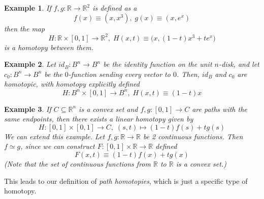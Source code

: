 \documentclass{article}
\newtheorem{example}{Example}[section]
\theoremstyle{remark}
\theoremstyle{definition}
\begin{document}
\begin{example}
If $f, g: \mathbb{R} \longrightarrow \mathbb{R}^2$ is defined as a
\[f(x) \equiv (x, x^3), \; g(x) \equiv (x, e^x)\]
then the map 
\[H: \mathbb{R} \times [0,1] \longrightarrow \mathbb{R}^2, \; H(x, t) \equiv \big( x, (1-t) x^3 + t e^x \big) \]
is a homotopy between them. 
\end{example}

\begin{example}
Let $id_B: B^n \longrightarrow B^n$ be the identity function on the unit $n$-disk, and let $c_0: B^n \longrightarrow B^n$ be the $0$-function sending every vector to $0$. Then, $id_B$ and $c_0$ are homotopic, with homotopy explicitly defined
\[H: B^n \times [0,1] \longrightarrow B^n, \; H(x, t) \equiv (1-t) x\]
\end{example}

\begin{example}
If $C \subseteq \mathbb{R}^n$ is a convex set and $f, g: [0,1] \longrightarrow C$ are paths with the same endpoints, then there exists a \textit{linear homotopy} given by 
\[H: [0,1] \times [0,1] \longrightarrow C, \; (s, t) \mapsto (1-t) f(s) + t g(s)\]
We can extend this example. Let $f, g: \mathbb{R} \longrightarrow \mathbb{R}$ be 2 continuous functions. Then $f \simeq g$, since we can construct $F: [0,1] \times \mathbb{R} \longrightarrow \mathbb{R}$ defined
\[F(x, t) \equiv (1-t) f(x) + t g(x)\]
(Note that the set of continuous functions from $\mathbb{R}$ to $\mathbb{R}$ is a convex set.)
\end{example}
This leads to our definition of \textit{path homotopies}, which is just a specific type of homotopy. 
\end{document}
